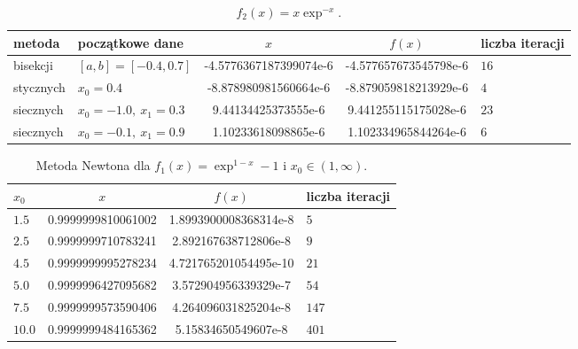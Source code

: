 \documentclass{classrep}
\begin{document}
		\begin{table}[!hpbt]
        		\centering
        		\footnotesize
			\begin{tabular}{llSSl} \toprule
				{metoda} & {początkowe dane} &{$x$} & {$f(x)$} & {liczba iteracji}\\ \midrule
				bisekcji & $[a,b]=[-0.4,0.7]$ & -4.5776367187399074e-6 & -4.577657673545798e-6 & $16$ \\ 
	 			stycznych & $x_0=0.4$ & -8.878980981560664e-6 & -8.879059818213929e-6 & $4$ \\  	
	 			siecznych & $x_0=-1.0,~x_1=0.3$ & 9.44134425373555e-6 & 9.441255115175028e-6 & $23$ \\
	 			siecznych & $x_0=-0.1,~x_1=0.9$ & 1.10233618098865e-6 & 1.102334965844264e-6 & $6$ \\ \bottomrule
	 		\end{tabular}
	 		\caption{$f_2(x)=x\exp^{-x}$.}
			\label{table:4}			
		\end{table}	
		
		\begin{table}[!hpbt]
        		\centering
        		\footnotesize
			\begin{tabular}{lSSl} \toprule
				{$x_0$} & {$x$} & {$f(x)$} & {liczba iteracji}\\ \midrule
				$1.5$ & 0.9999999810061002 & 1.8993900008368314e-8 & $5$ \\ 
				$2.5$ & 0.9999999710783241 & 2.892167638712806e-8 & $9$ \\
	 			$4.5$ & 0.9999999995278234 & 4.721765201054495e-10 & $21$ \\
	 			$5.0$ & 0.9999996427095682 & 3.572904956339329e-7 & $54$ \\
	 			$7.5$ & 0.9999999573590406 & 4.264096031825204e-8 & $147$ \\
	 			$10.0$ & 0.9999999484165362 & 5.15834650549607e-8 & $401$ \\ \bottomrule
	 		\end{tabular}
	 		\caption{Metoda Newtona dla $f_1(x)=\exp^{1-x}-1$ i $x_0\in{(1,\infty)}$.}
			\label{table:5}			
		\end{table}	
		
\end{document}

